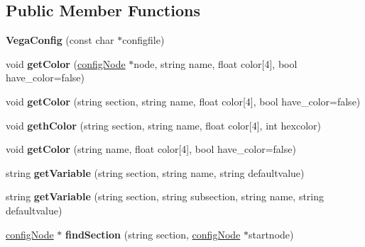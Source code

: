 \subsection*{Public Member Functions}
\begin{DoxyCompactItemize}
\item 
{\bfseries Vega\+Config} (const char $\ast$configfile)\hypertarget{classVegaConfig_a4e867874b9cedf3b3a150886ac90013e}{}\label{classVegaConfig_a4e867874b9cedf3b3a150886ac90013e}

\item 
void {\bfseries get\+Color} (\hyperlink{classconfigNode}{config\+Node} $\ast$node, string name, float color\mbox{[}4\mbox{]}, bool have\+\_\+color=false)\hypertarget{classVegaConfig_a4b01315822eda31cdb3a6a7dc3c83ef8}{}\label{classVegaConfig_a4b01315822eda31cdb3a6a7dc3c83ef8}

\item 
void {\bfseries get\+Color} (string section, string name, float color\mbox{[}4\mbox{]}, bool have\+\_\+color=false)\hypertarget{classVegaConfig_ad4837e7929e7c514b60131a1a7651788}{}\label{classVegaConfig_ad4837e7929e7c514b60131a1a7651788}

\item 
void {\bfseries geth\+Color} (string section, string name, float color\mbox{[}4\mbox{]}, int hexcolor)\hypertarget{classVegaConfig_a9e2b38827c3e0bad4714e25138384cf7}{}\label{classVegaConfig_a9e2b38827c3e0bad4714e25138384cf7}

\item 
void {\bfseries get\+Color} (string name, float color\mbox{[}4\mbox{]}, bool have\+\_\+color=false)\hypertarget{classVegaConfig_abdd7d4d59f103f603985be44316b5de0}{}\label{classVegaConfig_abdd7d4d59f103f603985be44316b5de0}

\item 
string {\bfseries get\+Variable} (string section, string name, string defaultvalue)\hypertarget{classVegaConfig_a42510bd3f6901f46c6de0684386c3747}{}\label{classVegaConfig_a42510bd3f6901f46c6de0684386c3747}

\item 
string {\bfseries get\+Variable} (string section, string subsection, string name, string defaultvalue)\hypertarget{classVegaConfig_a0d58134c5c2a8bb422d961fbfdca92ad}{}\label{classVegaConfig_a0d58134c5c2a8bb422d961fbfdca92ad}

\item 
\hyperlink{classconfigNode}{config\+Node} $\ast$ {\bfseries find\+Section} (string section, \hyperlink{classconfigNode}{config\+Node} $\ast$startnode)\hypertarget{classVegaConfig_a1932e1b234067d64ceb3a94ab419702e}{}\label{classVegaConfig_a1932e1b234067d64ceb3a94ab419702e}


\end{DoxyCompactItemize}
